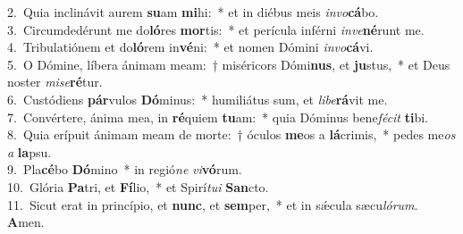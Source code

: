 {2.~}Quia inclinávit aurem \textbf{su}am \textbf{mi}hi:~* et in diébus meis \textit{in}\textit{vo}\textbf{cá}bo.\\
{3.~}Circumdedérunt me do\textbf{ló}res \textbf{mor}tis:~* et perícula inférni \textit{in}\textit{ve}\textbf{né}runt me.\\
{4.~}Tribulatiónem et do\textbf{ló}rem in\textbf{vé}ni:~* et nomen Dómini \textit{in}\textit{vo}\textbf{cá}vi.\\
{5.~}O Dómine, líbera ánimam meam:~† miséricors Dómi\textbf{nus}, et \textbf{ju}stus,~* et Deus noster \textit{mi}\textit{se}\textbf{ré}tur.\\
{6.~}Custódiens \textbf{pár}vulos \textbf{Dó}minus:~* humiliátus sum, et \textit{li}\textit{be}\textbf{rá}vit me.\\
{7.~}Convértere, ánima mea, in \textbf{ré}quiem \textbf{tu}am:~* quia Dóminus bene\textit{fé}\textit{cit} \textbf{ti}bi.\\
{8.~}Quia erípuit ánimam meam de morte:~† óculos \textbf{me}os a \textbf{lá}crimis,~* pedes me\textit{os} \textit{a} \textbf{la}psu.\\
{9.~}Pla\textbf{cé}bo \textbf{Dó}mino~* in regió\textit{ne} \textit{vi}\textbf{vó}rum.\\
{10.~}Glória \textbf{Pa}tri, et \textbf{Fí}lio,~* et Spirí\textit{tu}\textit{i} \textbf{San}cto.\\
{11.~}Sicut erat in princípio, et \textbf{nunc}, et \textbf{sem}per,~* et in sǽcula sæcu\textit{ló}\textit{rum}. \textbf{A}men.\\
